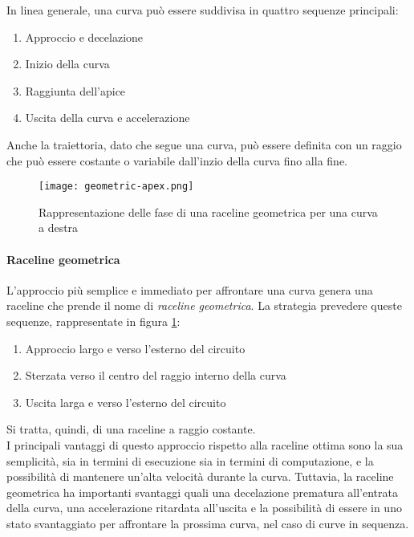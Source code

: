In linea generale, una curva può essere suddivisa in quattro sequenze principali: %
\begin{enumerate}
	\item Approccio e decelazione
	\item Inizio della curva
	\item Raggiunta dell'apice
	\item Uscita della curva e accelerazione
\end{enumerate}

Anche la traiettoria, dato che segue una curva, può essere definita con un raggio che può essere
costante o variabile dall'inzio della curva fino alla fine.

\begin{figure}[h]
	\begin{center}
		\texttt{[image: geometric-apex.png]}
	\end{center}
	\caption{Rappresentazione delle fase di una raceline geometrica per una curva a destra}\label{fig:geom-raceline}
\end{figure}

\paragraph{Raceline geometrica}
L'approccio più semplice e immediato per affrontare una curva genera una raceline che prende il
nome di \textit{raceline geometrica}. La strategia prevedere queste sequenze, rappresentate in figura
\ref{fig:geom-raceline}:
\begin{enumerate}
	\item Approccio largo e verso l'esterno del circuito 
	\item Sterzata verso il centro del raggio interno della curva 
	\item Uscita larga e verso l'esterno del circuito
\end{enumerate}
Si tratta, quindi, di una raceline a raggio costante.\\
I principali vantaggi di questo approccio rispetto alla raceline ottima sono la sua semplicità, sia in
termini di esecuzione sia in termini di computazione, e la possibilità di mantenere un'alta velocità
durante la curva. Tuttavia, la raceline geometrica ha importanti svantaggi quali una decelazione
prematura all'entrata della curva, una accelerazione ritardata all'uscita e la possibilità di essere in
uno stato svantaggiato per affrontare la prossima curva, nel caso di curve in sequenza.

